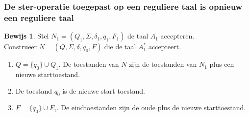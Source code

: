 \documentclass[12pt,a4paper]{article}
\theoremstyle{definition}
\newtheorem{bewijs}{Bewijs}[section]
\begin{document}
\subsubsection{De ster-operatie toegepast op een reguliere taal is opnieuw een reguliere taal}
\begin{bewijs}
Stel $N_1 = (Q_1,\Sigma,\delta_1,q_1,F_1)$ de taal $A_1$ accepteren.\\

Construeer $N=(Q,\Sigma,\delta,q_0,F)$ die de taal $A^*_1$ accepteert.
\begin{enumerate}
\item $Q=\{q_0\} \cup Q_1$. De toestanden van $N$ zijn de toestanden van $N_1$ plus een nieuwe starttoestand.
\item De toestand $q_0$ is de nieuwe start toestand.
\item $F = \{q_0\}\cup F_1$. De eindtoestanden zijn de oude plus de nieuwe starttoestand.
\end{enumerate}
\end{bewijs}
\end{document}
